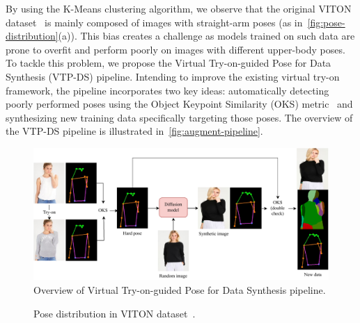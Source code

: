 By using the K-Means clustering algorithm, we observe that the original VITON dataset~\cite{Han-CVPR2018-Viton} is mainly composed of images with straight-arm poses (as in~\autoref{fig:pose-distribution}(a)). This bias creates a challenge as models trained on such data are prone to overfit and perform poorly on images with different upper-body poses. To tackle this problem, we propose the Virtual Try-on-guided Pose for Data Synthesis (VTP-DS) pipeline. Intending to improve the existing virtual try-on framework, the pipeline incorporates two key ideas: automatically detecting poorly performed poses using the Object Keypoint Similarity (OKS) metric~\cite{Lin-ECCV2014-Microsoft} and synthesizing new training data specifically targeting those poses. The overview of the VTP-DS pipeline is illustrated in~\autoref{fig:augment-pipeline}.

\begin{figure}[h!]
 \centering 
 \includegraphics[scale=0.55]{content/resources/images/tryon/augment-pipeline.pdf}
  \caption{Overview of Virtual Try-on-guided Pose for Data Synthesis pipeline.}
   \label{fig:augment-pipeline}
   \vspace{-2mm}
\end{figure}

\begin{figure}[h!]
    \centering
    \caption{Pose distribution in VITON dataset~\cite{Han-CVPR2018-Viton}.}
    \label{fig:pose-distribution}
    \vspace{-2mm}
\end{figure}

